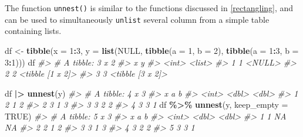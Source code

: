 \documentclass[
]{book}
\newenvironment{Shaded}{\begin{snugshade}}{\end{snugshade}}
\newcommand{\AttributeTok}[1]{\textcolor[rgb]{0.13,0.29,0.53}{#1}}
\newcommand{\CommentTok}[1]{\textcolor[rgb]{0.56,0.35,0.01}{\textit{#1}}}
\newcommand{\ConstantTok}[1]{\textcolor[rgb]{0.56,0.35,0.01}{#1}}
\newcommand{\DecValTok}[1]{\textcolor[rgb]{0.00,0.00,0.81}{#1}}
\newcommand{\FunctionTok}[1]{\textcolor[rgb]{0.13,0.29,0.53}{\textbf{#1}}}
\newcommand{\NormalTok}[1]{#1}
\newcommand{\OtherTok}[1]{\textcolor[rgb]{0.56,0.35,0.01}{#1}}
\newcommand{\SpecialCharTok}[1]{\textcolor[rgb]{0.81,0.36,0.00}{\textbf{#1}}}
\begin{document}
The function \texttt{unnest()} is similar to the functions discussed in \ref{rectangling}, and can be used to simultaneously \texttt{unlist} several column from a simple table containing lists.

\begin{Shaded}
\begin{Highlighting}[]
\NormalTok{df }\OtherTok{\textless{}{-}} \FunctionTok{tibble}\NormalTok{(}\AttributeTok{x =} \DecValTok{1}\SpecialCharTok{:}\DecValTok{3}\NormalTok{,}
             \AttributeTok{y =} \FunctionTok{list}\NormalTok{(}\ConstantTok{NULL}\NormalTok{,}
                      \FunctionTok{tibble}\NormalTok{(}\AttributeTok{a =} \DecValTok{1}\NormalTok{, }\AttributeTok{b =} \DecValTok{2}\NormalTok{),}
                      \FunctionTok{tibble}\NormalTok{(}\AttributeTok{a =} \DecValTok{1}\SpecialCharTok{:}\DecValTok{3}\NormalTok{, }\AttributeTok{b =} \DecValTok{3}\SpecialCharTok{:}\DecValTok{1}\NormalTok{)))}
\NormalTok{df}
\CommentTok{\#\textgreater{} \# A tibble: 3 x 2}
\CommentTok{\#\textgreater{}       x y               }
\CommentTok{\#\textgreater{}   \textless{}int\textgreater{} \textless{}list\textgreater{}          }
\CommentTok{\#\textgreater{} 1     1 \textless{}NULL\textgreater{}          }
\CommentTok{\#\textgreater{} 2     2 \textless{}tibble [1 x 2]\textgreater{}}
\CommentTok{\#\textgreater{} 3     3 \textless{}tibble [3 x 2]\textgreater{}}
  
\NormalTok{df }\SpecialCharTok{|\textgreater{}} \FunctionTok{unnest}\NormalTok{(y)}
\CommentTok{\#\textgreater{} \# A tibble: 4 x 3}
\CommentTok{\#\textgreater{}       x     a     b}
\CommentTok{\#\textgreater{}   \textless{}int\textgreater{} \textless{}dbl\textgreater{} \textless{}dbl\textgreater{}}
\CommentTok{\#\textgreater{} 1     2     1     2}
\CommentTok{\#\textgreater{} 2     3     1     3}
\CommentTok{\#\textgreater{} 3     3     2     2}
\CommentTok{\#\textgreater{} 4     3     3     1}
\NormalTok{df }\SpecialCharTok{\%\textgreater{}\%} \FunctionTok{unnest}\NormalTok{(y, }\AttributeTok{keep\_empty =} \ConstantTok{TRUE}\NormalTok{)}
\CommentTok{\#\textgreater{} \# A tibble: 5 x 3}
\CommentTok{\#\textgreater{}       x     a     b}
\CommentTok{\#\textgreater{}   \textless{}int\textgreater{} \textless{}dbl\textgreater{} \textless{}dbl\textgreater{}}
\CommentTok{\#\textgreater{} 1     1    NA    NA}
\CommentTok{\#\textgreater{} 2     2     1     2}
\CommentTok{\#\textgreater{} 3     3     1     3}
\CommentTok{\#\textgreater{} 4     3     2     2}
\CommentTok{\#\textgreater{} 5     3     3     1}
  

\end{Highlighting}
\end{Shaded}
\end{document}
